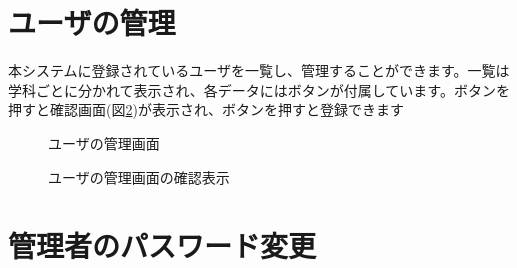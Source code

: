 \documentclass[11ptm]{jsarticle}
\begin{document}
\section{ユーザの管理}
\label{sec:ユーザの管理}
本システムに登録されているユーザを一覧し、管理することができます。一覧は学科ごとに分かれて表示され、各データにはボタンが付属しています。ボタンを押すと確認画面(図\ref{fig:ユーザの管理画面の確認表示})が表示され、ボタンを押すと登録できます
\begin{figure}[h]
  \centering
  \caption{\label{fig:ユーザの管理画面}ユーザの管理画面}
\end{figure}
\begin{figure}[h]
  \centering
  \caption{\label{fig:ユーザの管理画面の確認表示}ユーザの管理画面の確認表示}
\end{figure}


\clearpage
\section{管理者のパスワード変更}
\label{sec:管理者のパスワード変更}
\end{document}

